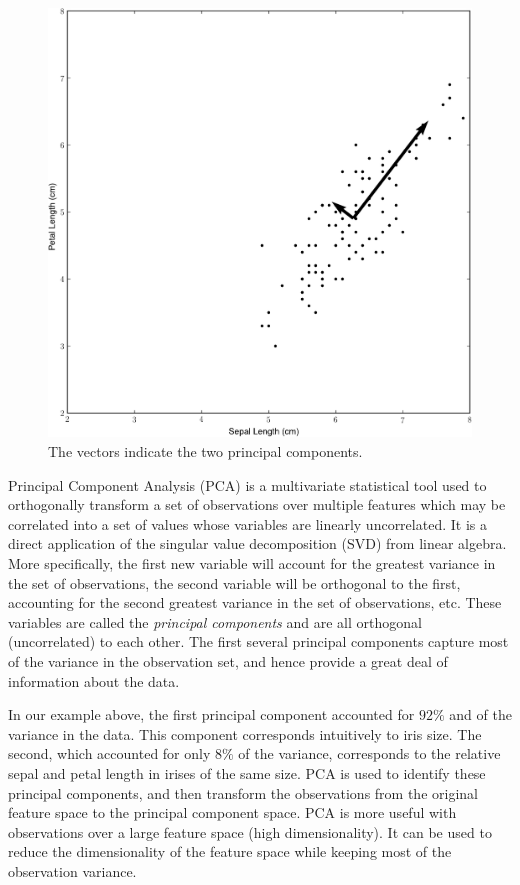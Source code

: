 \begin{figure}
\includegraphics[width=\textwidth]{iris2.pdf}
\caption{The vectors indicate the two principal components.}
\label{fig:iris_2}
\end{figure}

Principal Component Analysis (PCA) is a multivariate statistical tool used to orthogonally transform a set of observations over multiple features which may be correlated into a set of values whose variables are linearly uncorrelated. It is a direct application of the singular value decomposition (SVD) from linear algebra. More specifically, the first new variable will account for the greatest variance in the set of observations, the second variable will be orthogonal to the first, accounting for the second greatest variance in the set of observations, etc. These variables are called the \emph{principal components} and are all orthogonal (uncorrelated) to each other. The first several principal components capture most of the variance in the observation set, and hence provide a great deal of information about the data.

In our example above, the first principal component accounted for $92\%$ and of the variance in the data. This component corresponds intuitively to iris size. The second, which accounted for only $8\%$ of the variance, corresponds to the relative sepal and petal length in irises of the same size. PCA is used to identify these principal components, and then transform the observations from the original feature space to the principal component space.
PCA is more useful with observations over a large feature space (high dimensionality). It can be used to reduce the dimensionality of the feature space while keeping most of the observation variance.

